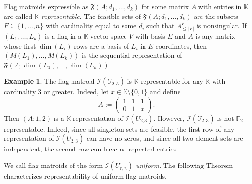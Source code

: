 \documentclass[12pt]{article}
\theoremstyle{definition}
\newtheorem{ex}[thm]{Example}
\begin{document}
Flag matroids expressible as $\mathfrak{F}(A; d_1,\dots,d_k)$ for some matrix $A$ with entries in $\mathbb{K}$ are called \emph{$\mathbb{K}$-representable}.
The feasible sets of $\mathfrak{F}(A;d_1,\dots,d_k)$ are the subsets $F \subseteq \{1,\dots,n\}$ with cardinality equal to some $d_i$
such that $A_{\leq |F|}^F$ is nonsingular.
If $(L_1,\dots,L_k)$ is a flag in a $\mathbb{K}$-vector space $V$ with basis $E$
and $A$ is any matrix whose first $\dim(L_i)$ rows are a basis of $L_i$ in $E$ coordinates,
then $(M(L_1),\dots,M(L_k))$ is the sequential representation of $\mathfrak{F}(A;\dim(L_1),\dots,\dim(L_k))$.


\begin{ex}
    The flag matroid $\mathcal{I}(U_{2,3})$ is $\mathbb{K}$-representable for any $\mathbb{K}$ with cardinality $3$ or greater.
    Indeed, let $x \in \mathbb{K} \setminus \{0,1\}$ and define
    \begin{equation*}
        A:= \begin{pmatrix}
            1 & 1 & 1 \\
            0 & 1 & x
        \end{pmatrix}.
    \end{equation*}
    Then $(A;1,2)$ is a $\mathbb{K}$-representation of $\mathcal{I}(U_{2,3})$.
    However, $\mathcal{I}(U_{2,3})$ is not $\mathbb{F}_2$-representable.
    Indeed, since all singleton sets are feasible, the first row of any representation of $\mathcal{I}(U_{2,3})$
    can have no zeros, and since all two-element sets are independent, the second row can have no repeated entries.
\end{ex}

We call flag matroids of the form $\mathcal{I}(U_{r,n})$ \emph{uniform}.
The following Theorem characterizes representability of uniform flag matroids.
\end{document}
